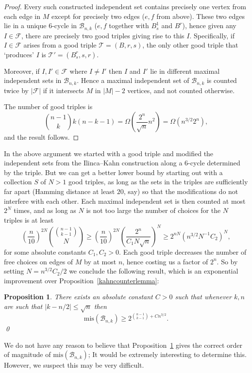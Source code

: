 \documentclass[11pt]{article}
\newtheorem{prop}[theorem]{Proposition}
\numberwithin{equation}{section}
\def\B{\mathcal{B}}
\def\F{\mathcal{F}}
\def\T{\mathcal{T}}
\def\mis{\text{mis}}
\begin{document}
\begin{proof}
Every such constructed independent set contains precisely one vertex from each edge in $M$ except for precisely two edges ($e,f$ from above). These two edges lie in a unique $6$-cycle in $\B_{n,k}$ ($e,f$ together with $B^1_s$ and $B^r$), hence given any $I\in \F$, there are precisely two good triples giving rise to this $I$. 
Specifically, if $I\in \mathcal F$ arises from a good triple $\T=(B,r,s)$, the only other good triple that `produces' $I$ is $\T '=(B^r_s,s,r)$.

Moreover, if $I,I' \in \F$ where $I \not =I'$ then $I$ and $I'$ lie in different maximal independent sets in $\B _{n,k}$.
Hence a maximal independent set of $\B_{n,k}$ is counted twice by $|\F|$ if it intersects $M$ in $|M|-2$ vertices, and not counted otherwise.

The number of good triples is $$\binom{n-1}{k}k(n-k-1)=\Omega\left(\frac{2^n}{\sqrt{n}}n^2\right) = \Omega\left(n^{3/2}2^n\right),$$
and the result follows.

\end{proof}

In the above argument we started with a good triple and modified the independent sets from the Ilinca--Kahn construction along a $6$-cycle determined by the triple. But we can get a better lower bound by starting out with a collection $S$ of $N>1$ good triples, as long as the sets in the triples are sufficiently far apart (Hamming distance at least $20$, say) so that the modifications do not interfere with each other. Each maximal independent set is then counted at most $2^{N}$ times, and as long as $N$ is not too large the number of choices for the $N$ triples is at least $$\left(\frac{n}{10}\right)^{2N}\binom{\binom{n-1}{k-1}}{N}\geq \left(\frac{n}{10}\right)^{2N}\left(\frac{2^n}{C_1N\sqrt{n}}\right)^{N} \geq 2^{nN} \left(n^{3/2} N^{-1} C_2 \right)^N, $$ for some absolute constants $C_1,C_2>0$. Each good triple decreases the number of free choices on edges of $M$ by at most $n$, hence costing us a factor of $2^n$. So by setting $N=n^{3/2}C_2/2$ we conclude the following result, which is an exponential improvement over Proposition~\ref{kahncounterlemma}:
\begin{prop}\label{kahncounterlemma2}
There exists an absolute constant $C>0$ such that whenever $k,n$ are such that $|k-n/2|\leq \sqrt{n}$ then $$\mis(\B_{n,k})\geq 2^{\binom{n-1}{k-1}+Cn^{3/2}}.$$\qed
\end{prop}
We do not have any reason to believe that Proposition~\ref{kahncounterlemma2} gives the correct order of magnitude of $\mis(\B_{n,k})$; It would be extremely interesting to determine this. However, we suspect this may   be very difficult.
\end{document}
